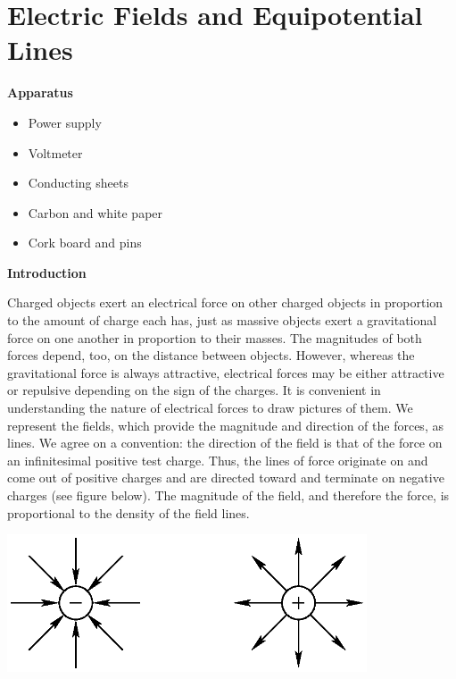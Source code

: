 
\section{Electric Fields and Equipotential Lines}

\makelabheader %


\bigskip
\textbf{Apparatus}
\begin{itemize} 
\setlength\itemsep{-1pt}
\setlength\topsep{-6pt}
\setlength\partopsep{-6pt}
\vspace{-0.1in}  

\item Power supply
\item Voltmeter
\item Conducting sheets
\item Carbon and white paper
\item Cork board and pins
\end{itemize}

\medskip

\textbf{Introduction}

Charged objects exert an electrical force on other charged objects
in proportion to the amount of charge each has, just as massive objects
exert a gravitational force on one another in proportion to their
masses. The magnitudes of both forces depend, too, on the distance
between objects. However, whereas the gravitational force is always
attractive, electrical forces may be either attractive or repulsive
depending on the sign of the charges. It is convenient in understanding
the nature of electrical forces to draw pictures of them. We represent
the fields, which provide the magnitude and direction of the forces,
as lines. We agree on a convention: the direction of the field is
that of the force on an infinitesimal positive test charge. Thus,
the lines of force originate on and come out of positive charges and
are directed toward and terminate on negative charges (see figure
below). The magnitude of the field, and therefore the force, is proportional
to the density of the field lines.

{\centering \includegraphics[height=1.6in]{electric_fields_and_equipotential_lines/ef_equipot_lines_fig_1.eps} \par}

